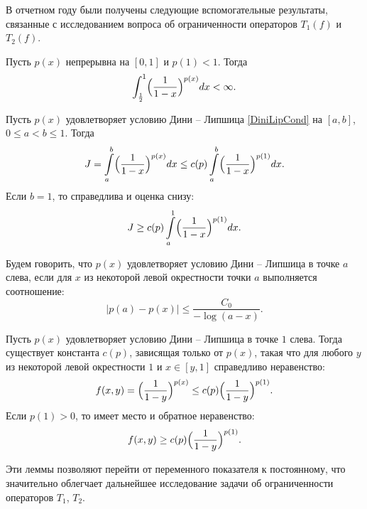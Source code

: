 В отчетном году были получены следующие вспомогательные результаты, связанные с исследованием вопроса об ограниченности операторов $T_1(f)$ и $T_2(f)$.
\begin{lemma}\label{st-Int1-x-p4-bounded}
Пусть $p(x)$ непрерывна на $[0,1]$ и $p(1)<1$. Тогда
\begin{equation}\label{int-of-1-x-qrtr-exp}
  \int_{\frac12}^1\Bigl(\frac1{1-x}\Bigr)^{p(x)}dx<\infty.
\end{equation}
\end{lemma}

\begin{lemma}\label{est-px-p1}
Пусть $p(x)$ удовлетворяет условию Дини -- Липшица \eqref{DiniLipCond} на $[a,b]$, $0 \le a < b \le 1$. Тогда
\begin{equation}
J=\int\limits_{a}^{b} \Bigl( \frac{1}{1-x} \Bigr)^{p(x)}dx \le
c(p) \int\limits_{a}^{b} \Bigl( \frac{1}{1-x} \Bigr)^{p(1)}dx.
\end{equation}
Если $b=1$, то справедлива и оценка снизу:
\begin{equation}
J \ge
c(p) \int\limits_{a}^{1} \Bigl( \frac{1}{1-x} \Bigr)^{p(1)}dx.
\end{equation}
\end{lemma}
\begin{definition}
Будем говорить, что $p(x)$ удовлетворяет условию Дини -- Липшица в точке $a$ слева, если для $x$ из некоторой левой окрестности точки $a$ выполняется соотношение:
\begin{equation}\label{DL-at-point}
|p(a)-p(x)| \le \frac{C_0}{-\log(a-x)}.
\end{equation}
\end{definition}

\begin{lemma}\label{st-px-p1-func}
Пусть $p(x)$ удовлетворяет условию Дини -- Липшица в точке $1$ слева. Тогда существует константа $c(p)$, зависящая только от $p(x)$, такая что для любого $y$ из некоторой левой окрестности $1$ и $x \in [y,1]$ справедливо неравенство:
\begin{equation}
f(x,y)=\Bigl(\frac{1}{1-y}\Bigr)^{p(x)} \le c(p)\Bigl(\frac{1}{1-y}\Bigr)^{p(1)}.
\end{equation}
Если $p(1)>0$, то имеет место и обратное неравенство:
\begin{equation}
f(x,y) \ge c(p)\Bigl(\frac{1}{1-y}\Bigr)^{p(1)}.
\end{equation}
\end{lemma}
Эти леммы позволяют перейти от переменного показателя к постоянному, что значительно облегчает дальнейшее исследование задачи об ограниченности операторов $T_1$, $T_2$.

